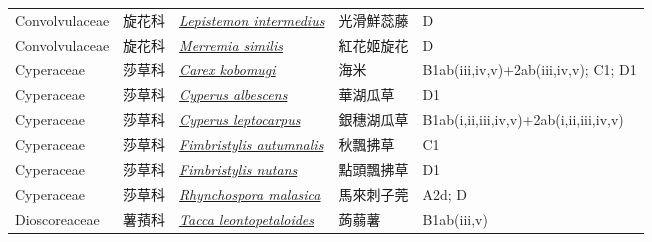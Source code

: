 {\begin{longtable}{L{2.5cm}L{2cm}L{5cm}L{2.5cm}L{3cm}}
    Convolvulaceae & 旋花科 & \href{http://www.theplantlist.org/tpl1.1/search?q=Lepistemon+intermedius}{\textit{Lepistemon intermedius} } & 光滑鮮蕊藤 & D    \\
    Convolvulaceae & 旋花科 & \href{http://www.theplantlist.org/tpl1.1/search?q=Merremia+similis}{\textit{Merremia similis} } & 紅花姬旋花 & D    \\
    Cyperaceae & 莎草科 & \href{http://www.theplantlist.org/tpl1.1/search?q=Carex+kobomugi}{\textit{Carex kobomugi} } & 海米 & B1ab(iii,iv,v)+2ab(iii,iv,v); C1; D1    \\
    Cyperaceae & 莎草科 & \href{http://www.theplantlist.org/tpl1.1/search?q=Cyperus+albescens}{\textit{Cyperus albescens} } & 華湖瓜草 & D1    \\
    Cyperaceae & 莎草科 & \href{http://www.theplantlist.org/tpl1.1/search?q=Cyperus+leptocarpus}{\textit{Cyperus leptocarpus} } & 銀穗湖瓜草 & B1ab(i,ii,iii,iv,v)+2ab(i,ii,iii,iv,v)    \\
    Cyperaceae & 莎草科 & \href{http://www.theplantlist.org/tpl1.1/search?q=Fimbristylis+autumnalis}{\textit{Fimbristylis autumnalis} } & 秋飄拂草 & C1    \\
    Cyperaceae & 莎草科 & \href{http://www.theplantlist.org/tpl1.1/search?q=Fimbristylis+nutans}{\textit{Fimbristylis nutans} } & 點頭飄拂草 & D1    \\
    Cyperaceae & 莎草科 & \href{http://www.theplantlist.org/tpl1.1/search?q=Rhynchospora+malasica}{\textit{Rhynchospora malasica} } & 馬來刺子莞 & A2d; D    \\
    Dioscoreaceae & 薯蕷科 & \href{http://www.theplantlist.org/tpl1.1/search?q=Tacca+leontopetaloides}{\textit{Tacca leontopetaloides} } & 蒟蒻薯 & B1ab(iii,v)    \\

\end{longtable}}
